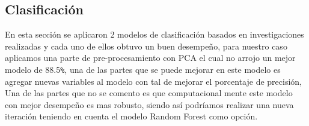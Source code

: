 \documentclass[10pt,journal]{IEEEtran}
\begin{document}
\subsection{Clasificación}

En esta sección se aplicaron 2 modelos de clasificación basados en investigaciones realizadas y cada uno de ellos obtuvo un buen desempeño, para nuestro caso aplicamos una parte de pre-procesamiento con PCA el cual no arrojo un mejor modelo de 88.5\verb|%|, una de las partes que se puede mejorar en este modelo es agregar nuevas variables al modelo con tal de mejorar el porcentaje de precisión, Una de las partes que no se comento es que computacional mente este modelo con mejor desempeño es mas robusto, siendo así podríamos realizar una nueva iteración teniendo en cuenta el modelo Random Forest como opción.
\end{document}
